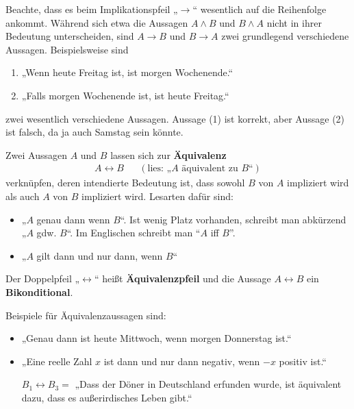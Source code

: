\begin{bem}
    Beachte, dass es beim Implikationspfeil „$\to$“ wesentlich auf die Reihenfolge ankommt. Während sich etwa die Aussagen $A\land B$ und $B\land A$ nicht in ihrer Bedeutung unterscheiden, sind $A\to B$ und $B\to A$ zwei grundlegend verschiedene Aussagen. Beispielsweise sind
    \begin{enumerate}[(1)]
        \item „Wenn heute Freitag ist, ist morgen Wochenende.“
        \item „Falls morgen Wochenende ist, ist heute Freitag.“
    \end{enumerate}
    zwei wesentlich verschiedene Aussagen. Aussage (1) ist korrekt, aber Aussage (2) ist falsch, da ja auch Samstag sein könnte.
\end{bem}


\begin{defin}[Äquivalenz] 
    Zwei Aussagen $A$ und $B$ lassen sich zur \textbf{Äquivalenz}
    \begin{align*}
        A\leftrightarrow B  && (\text{lies: „$A$ äquivalent zu $B$“})
    \end{align*}
    verknüpfen, deren intendierte Bedeutung ist, dass sowohl $B$ von $A$ impliziert wird als auch $A$ von $B$ impliziert wird. Lesarten dafür sind:
    \begin{itemize}
        \item „$A$ genau dann wenn $B$“. Ist wenig Platz vorhanden, schreibt man abkürzend „$A$ gdw. $B$“. Im Englischen schreibt man ``$A$ iff $B$''.
        \item „$A$ gilt dann und nur dann, wenn $B$“
    \end{itemize}
    Der Doppelpfeil „$\leftrightarrow$“ heißt \textbf{Äquivalenzpfeil} und die Aussage $A\leftrightarrow B$ ein \textbf{Bikonditional}.
\end{defin}

    
\begin{bsp}
    Beispiele für Äquivalenzaussagen sind:
    \begin{itemize}[labelindent=5.5em, labelwidth=, leftmargin=*]
        \item „Genau dann ist heute Mittwoch, wenn morgen Donnerstag ist.“
        \item „Eine reelle Zahl $x$ ist dann und nur dann negativ, wenn $-x$ positiv ist.“
        \item[$B_1\leftrightarrow B_3=$] „Dass der Döner in Deutschland erfunden wurde, ist äquivalent dazu, dass es außerirdisches Leben gibt.“
    \end{itemize}
\end{bsp}

